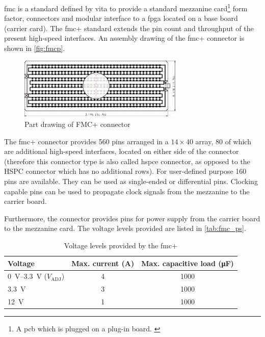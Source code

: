 \gls{fmc} is a standard defined by \gls{vita} to provide a standard mezzanine card\footnote{A \gls{pcb} which is plugged on a plug-in board. \cite{mezzanine}} form factor, connectors and modular interface to a \gls{fpga} located on a base board (carrier card). \cite{Seelam2009}
The \gls{fmc}+ standard extends the pin count and throughput of the present high-speed interfaces. 
An assembly drawing of the \gls{fmc}+ connector is shown in \autoref{fig:fmcp}.
\begin{figure}[H]
	\centering
	\includegraphics[width = 0.7\textwidth]{chap/04-theresa/img/connectors/fmcp.pdf}
	\caption[Rendering of FMC+ connector]{Part drawing of FMC+ connector \cite{fmcpic}}
	\label{fig:fmcp}
\end{figure}

The \gls{fmc}+ connector provides 560 pins arranged in a $14\times40$ array, 80 of which are additional high-speed interfaces, located on either side of the connector (therefore this connector type is also called \gls{hspce} connector, as opposed to the HSPC connector which has no additional rows).
For user-defined purpose 160 pins are available. 
They can be used as single-ended or differential pins.
Clocking capable pins can be used to propagate clock signals from the mezzanine to the carrier board. 

Furthermore, the connector provides pins for power supply from the carrier board to the mezzanine card. \cite{fmc} 
The voltage levels provided are listed in \autoref{tab:fmc_ps}.

\begin{table}[tb]
	\caption[FMC+ Voltages]{Voltage levels provided by the \gls{fmc}+}
	\label{tab:fmc_ps}
		\centering
		\begin{tabularx}{\textwidth}{XSS}
			\toprule
			{\textbf{Voltage}}                       & {\textbf{Max. current (\si{\ampere})}} & {\textbf{Max. capacitive load (\si{\micro\farad})}} \\ \midrule
			\SIrange{0}{3.3}{\volt} ($V_\text{ADJ}$) & 4                                      & 1000                                                \\
			\SI{3.3}{\volt}                          & 3                                      & 1000                                                \\
			\SI{12}{\volt}                           & 1                                      & 1000                                                \\ \bottomrule
		\end{tabularx}
\end{table}

